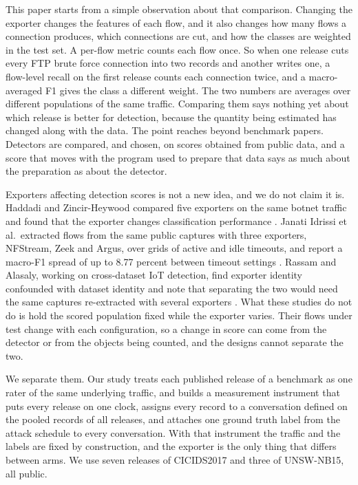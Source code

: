 \documentclass[pdflatex,sn-mathphys-num]{sn-jnl}
\newcommand{\litnum}[1]{#1}
\newcommand{\cicids}{CICIDS2017}
\theoremstyle{thmstyleone}%
\theoremstyle{thmstylethree}%
\begin{document}
This paper starts from a simple observation about that comparison. Changing the exporter changes the features of each flow, and it also changes how many flows a connection produces, which connections are cut, and how the classes are weighted in the test set. A per-flow metric counts each flow once. So when one release cuts every FTP brute force connection into two records and another writes one, a flow-level recall on the first release counts each connection twice, and a macro-averaged F1 gives the class a different weight. The two numbers are averages over different populations of the same traffic. Comparing them says nothing yet about which release is better for detection, because the quantity being estimated has changed along with the data. The point reaches beyond benchmark papers. Detectors are compared, and chosen, on scores obtained from public data, and a score that moves with the program used to prepare that data says as much about the preparation as about the detector.

Exporters affecting detection scores is not a new idea, and we do not claim it is. Haddadi and Zincir-Heywood compared five exporters on the same botnet traffic and found that the exporter changes classification performance \cite{haddadi2016}. Janati Idrissi et al.\ extracted flows from the same public captures with three exporters, NFStream, Zeek and Argus, over grids of active and idle timeouts, and report a macro-F1 spread of up to \litnum{8.77} percent between timeout settings \cite{janatiidrissi2025}. Rassam and Alasaly, working on cross-dataset IoT detection, find exporter identity confounded with dataset identity and note that separating the two would need the same captures re-extracted with several exporters \cite{rassam2026}. What these studies do not do is hold the scored population fixed while the exporter varies. Their flows under test change with each configuration, so a change in score can come from the detector or from the objects being counted, and the designs cannot separate the two.

We separate them. Our study treats each published release of a benchmark as one rater of the same underlying traffic, and builds a measurement instrument that puts every release on one clock, assigns every record to a conversation defined on the pooled records of all releases, and attaches one ground truth label from the attack schedule to every conversation. With that instrument the traffic and the labels are fixed by construction, and the exporter is the only thing that differs between arms. We use seven releases of \cicids{} and three of UNSW-NB15, all public.
\end{document}
